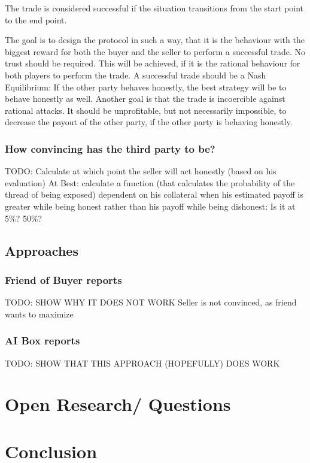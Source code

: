 \documentclass{cacthesis}
\begin{document}
The trade is considered successful if the situation transitions from the start point to the end point.

The goal is to design the protocol in such a way, that it is the behaviour with the biggest reward for both the buyer and the seller to perform a successful trade.\newline
No trust should be required. This will be achieved, if it is the rational behaviour for both players to perform the trade. A successful trade should be a Nash Equilibrium: If the other party behaves honestly, the best strategy will be to behave honestly as well.\newline
Another goal is that the trade is incoercible against rational attacks. It should be unprofitable, but not necessarily impossible, to decrease the payout of the other party, if the other party is behaving honestly. 

\subsection{How convincing has the third party to be?}
TODO: Calculate at which point the seller will act honestly (based on his evaluation)\newline
At Best: calculate a function (that calculates the probability of the thread of being exposed) dependent on his collateral when his estimated payoff is greater while being honest rather than his payoff while being dishonest: Is it at 5\%? 50\%?
\section{Approaches}
\subsection{Friend of Buyer reports}
TODO: SHOW WHY IT DOES NOT WORK
Seller is not convinced, as friend wants to maximize 
\subsection{AI Box reports}
TODO: SHOW THAT THIS APPROACH (HOPEFULLY) DOES WORK
\chapter{Open Research/ Questions}

\chapter{Conclusion}
\end{document}
